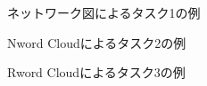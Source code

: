 \documentclass[syuuron]{kuee}
\begin{document}
		\begin{figure}
			\begin{center}
			\end{center}
			\caption{ネットワーク図によるタスク1の例}
	  		\label{fig:que1}
		\end{figure}
		\begin{figure}
			\begin{center}
			\end{center}
			\caption{Nword Cloudによるタスク2の例}
	  		\label{fig:que2}
		\end{figure}
		\begin{figure}
			\begin{center}
			\end{center}
			\caption{Rword Cloudによるタスク3の例}
	  		\label{fig:que3}
		\end{figure}
\end{document}
